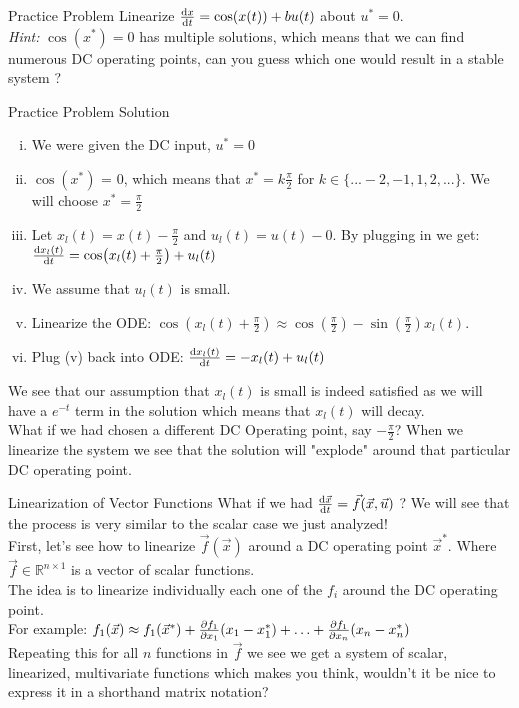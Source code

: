 \begin{frame}{Practice Problem}
  Linearize $\dv{x}{t}(t) = \cos(x(t)) + bu(t)$ about $u^* = 0$. \pause \\
\textit{Hint:} $\cos(x^*) = 0$ has multiple solutions, which means that we can find numerous DC operating points, can you guess which one would result in a stable system ? 
\end{frame}
\begin{frame}{Practice Problem Solution}
\begin{enumerate}[(i)]
\item We were given the DC input, $u^* = 0$ \pause \\
\item $\cos(x^*)$ = 0, which means that $x^* = k\frac{\pi}{2}$ for $k \in \{...-2,-1,1,2,...\}$. We will choose $x^* = \frac{\pi}{2}$ \pause \\
\item Let $x_l(t) = x(t) - \frac{\pi}{2}$ and $u_l(t) = u(t) - 0$.
By plugging in we get: $\dv{x_l(t)}{t} = \cos(x_l(t) + \frac{\pi}{2}) + u_l(t)$ \pause \\
\item We assume that $u_l(t)$ is small.\pause \\
\item Linearize the ODE: $\cos(x_l(t) + \frac{\pi}{2}) \approx \cos(\frac{\pi}{2}) - \sin(\frac{\pi}{2})x_l(t)$. \pause
\item Plug (v) back into ODE: 
$\dv{x_l(t)}{t} = -x_l(t) + u_l(t)$ 
\end{enumerate}
\pause 
We see that our assumption that  $x_l(t)$ is small is indeed satisfied as we will have a $e^{-t}$ term in the solution which means that $x_l(t)$ will decay.\\ \pause
What if we had chosen a different DC Operating point, say $-\frac{\pi}{2}$? When we linearize the system we see that the solution will "explode" around that particular DC operating point.
\end{frame}

\begin{frame}{Linearization of Vector Functions}
What if we had $\dv{\vec{x}}{t} = \vec{f}(\vec{x}, \vec{u})$ ? We will see that the process is very similar to the scalar case we just analyzed!\\ \pause
First, let's see how to linearize $\vec{f}(\vec{x})$ around a DC operating point $\vec{x}^*$. Where $\vec{f} \in \mathbb R^{n \times 1}$ is a vector of scalar functions. \\\pause
The idea is to linearize individually each one of the $f_i$ around the DC operating point. \\\pause
For example: $f_1(\vec{x}) \approx f_1(\vec{x}^*) + \pdv{f_1}{x_1}(\vec{x}^*)(x_1 - x_1^*) + \ldots +  \pdv{f_1}{x_n}(\vec{x}^*)(x_n - x_n^*)$\\\pause
Repeating this for all $n$ functions in $\vec{f}$ we see we get a system of scalar, linearized, multivariate functions which makes you think, wouldn't it be nice to express it in a shorthand matrix notation?
\end{frame}

